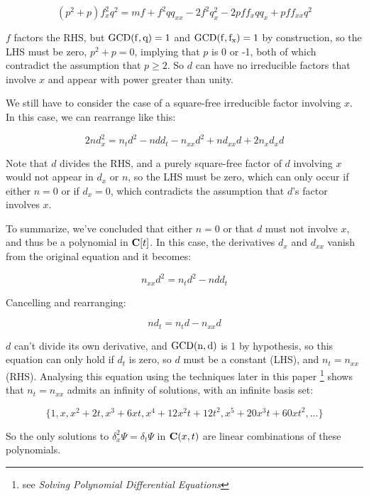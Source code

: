 \documentclass{article}
\newcommand{\C}{\ensuremath{{\bf C}}}
\newcommand{\GCD}{\ensuremath{\rm{GCD}}}
\begin{document}
$$(p^{2} +p)f_x^{2}q^{2} = m f+f^{2}qq_{xx} -2f^{2}q_x^{2} -2pff_xqq_x +pff_{xx}q^{2}$$

$f$ factors the RHS, but $\GCD(f,q)=1$ and $\GCD(f,f_x)=1$ by
construction, so the LHS must be zero, $p^2 + p = 0$, implying that
$p$ is 0 or -1, both of which contradict the assumption that $p \ge
2$.  So $d$ can have no irreducible factors that involve $x$ and
appear with power greater than unity.

\begin{comment}
The leading term in $2nd_x^2 - n d_{xx} d$ is of power $x^{2r-2}$ and
has coefficient $2r^2 d_r - r(r-1)d_r^2$, so $r^2 + r =0$, and $r$
must be either $0$ or $-1$.  Obviously it can't be $-1$, what about
$0$?  Then $d$ would be a polynomial in $t$ that didn't involve $x$.
\end{comment}

We still have to consider the case of a square-free irreducible factor
involving $x$.  In this case, we can rearrange like this:

$$2nd_x^2 = n_t d^2 - n d d_t - n_{xx} d^2 + n d_{xx} d + 2 n_{x}d_{x}d$$

Note that $d$ divides the RHS, and a purely square-free factor of $d$
involving $x$ would not appear in $d_x$ or $n$, so the LHS must be
zero, which can only occur if either $n=0$ or if $d_x=0$, which
contradicts the assumption that $d$'s factor involves $x$.

To summarize, we've concluded that either $n=0$ or that $d$ must not
involve $x$, and thus be a polynomial in $\C[t]$.  In this case, the
derivatives $d_x$ and $d_{xx}$ vanish from the original equation and it becomes:

$$n_{xx} d^2 = n_t d^2 - n d d_t$$

Cancelling and rearranging:

$$n d_t = n_t d - n_{xx} d$$

$d$ can't divide its own derivative, and $\GCD(n,d)$ is 1 by
hypothesis, so this equation can only hold if $d_t$ is zero, so $d$
must be a constant (LHS), and $n_t = n_{xx}$ (RHS).  Analysing
this equation using the techniques later in this paper
\footnote{see {\it Solving Polynomial Differential Equations}}
shows that $n_t = n_{xx}$ admits an infinity of solutions,
with an infinite basis set:

$$\{1, x, x^2 + 2t, x^3 + 6xt, x^4 + 12 x^2t + 12 t^2, x^5+20x^3t+60xt^2, \ldots\}$$

So the only solutions to $\delta_x^2 \Psi = \delta_t \Psi$ in
$\C(x,t)$ are linear combinations of these polynomials.
\end{document}

